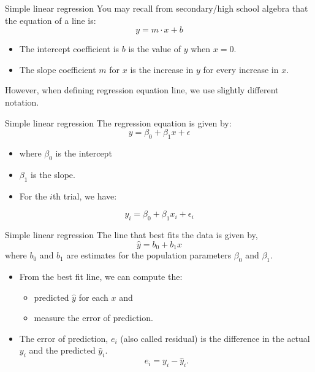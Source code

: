 \documentclass[
  ignorenonframetext,
]{beamer}
\providecommand{\tightlist}{%
  \setlength{\itemsep}{0pt}\setlength{\parskip}{0pt}}
\begin{document}
\begin{frame}{Simple linear regression}
\protect\hypertarget{simple-linear-regression-1}{}
You may recall from secondary/high school algebra that the equation of a
line is: \[y=m\cdot x + b\]

\begin{itemize}
\item
  The intercept coefficient is \(b\) is the value of \(y\) when \(x=0\).
\item
  The slope coefficient \(m\) for \(x\) is the increase in \(y\) for
  every increase in \(x\).
\end{itemize}

However, when defining regression equation line, we use slightly
different notation.
\end{frame}

\begin{frame}{Simple linear regression}
\protect\hypertarget{simple-linear-regression-2}{}
The regression equation is given by: \[y=\beta_0+\beta_1x+\epsilon\]

\begin{itemize}
\item
  where \(\beta_0\) is the intercept
\item
  \(\beta_1\) is the slope.
\item
  For the \(i\)th trial, we have:
\end{itemize}

\[y_i=\beta_0+\beta_1x_i+\epsilon_i\]
\end{frame}

\begin{frame}{Simple linear regression}
\protect\hypertarget{simple-linear-regression-3}{}
The line that best fits the data is given by, \[\hat{y}=b_0+b_1x\] where
\(b_0\) and \(b_1\) are estimates for the population parameters
\(\beta_0\) and \(\beta_1\).

\begin{itemize}
\item
  From the best fit line, we can compute the:

  \begin{itemize}
  \tightlist
  \item
    predicted \(\hat{y}\) for each \(x\) and
  \item
    measure the error of prediction.
  \end{itemize}
\item
  The error of prediction, \(e_i\) (also called residual) is the
  difference in the actual \(y_i\) and the predicted \(\hat{y}_i\).
  \[e_i=y_i-\hat{y}_i.\]
\end{itemize}
\end{frame}
\end{document}
